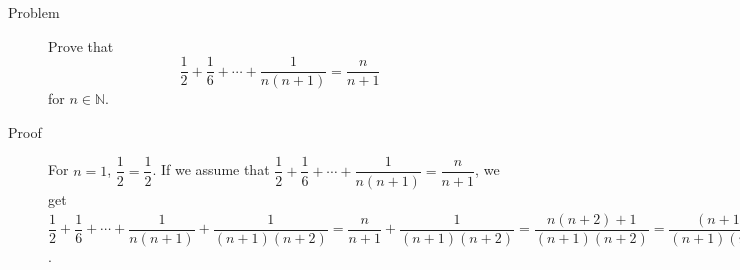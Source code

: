 \begin{description}
\item[Problem] Prove that
$$\dfrac 1 2 + \dfrac 1 6 + \cdots + \dfrac 1 {n(n+1)} = \dfrac n {n + 1}$$
for $n \in \mathbb{N}$.

\item[Proof] For $n = 1$, $\dfrac 1 2 = \dfrac 1 2$. If we assume that
$\dfrac 1 2 + \dfrac 1 6 + \cdots + \dfrac 1 {n(n+1)} = \dfrac n {n + 1}$, we
get $\dfrac 1 2 + \dfrac 1 6 + \cdots + \dfrac 1 {n(n+1)} + \dfrac 1
{(n+1)(n+2)} = \dfrac n {n + 1} + \dfrac 1 {(n+1)(n+2)} = \dfrac {n(n+2) + 1}
{(n+1)(n+2)} = \dfrac{(n+1)^2}{(n+1)(n+2)} = \dfrac {n + 1} {(n + 1) + 1}$.
\end{description}
